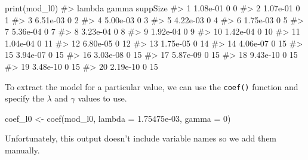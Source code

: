 \documentclass[
  letterpaper,
]{latex/krantz}
\makeatletter
\newenvironment{Shaded}{\begin{snugshade}}{\end{snugshade}}
\newcommand{\AttributeTok}[1]{\textcolor[rgb]{0.40,0.45,0.13}{#1}}
\newcommand{\CommentTok}[1]{\textcolor[rgb]{0.37,0.37,0.37}{#1}}
\newcommand{\DecValTok}[1]{\textcolor[rgb]{0.68,0.00,0.00}{#1}}
\newcommand{\FloatTok}[1]{\textcolor[rgb]{0.68,0.00,0.00}{#1}}
\newcommand{\FunctionTok}[1]{\textcolor[rgb]{0.28,0.35,0.67}{#1}}
\newcommand{\NormalTok}[1]{\textcolor[rgb]{0.00,0.23,0.31}{#1}}
\newcommand{\OtherTok}[1]{\textcolor[rgb]{0.00,0.23,0.31}{#1}}
\newenvironment{kframe}{%
\medskip{}
\setlength{\fboxsep}{.8em}
 \def\at@end@of@kframe{}%
 \ifinner\ifhmode%
  \def\at@end@of@kframe{\end{minipage}}%
  \begin{minipage}{\columnwidth}%
 \fi\fi%
 \def\FrameCommand##1{\hskip\@totalleftmargin \hskip-\fboxsep
 \colorbox{shadecolor}{##1}\hskip-\fboxsep
     \hskip-\linewidth \hskip-\@totalleftmargin \hskip\columnwidth}%
 \MakeFramed {\advance\hsize-\width
   \@totalleftmargin\z@ \linewidth\hsize
   \@setminipage}}%
 {\par\unskip\endMakeFramed%
 \at@end@of@kframe}
\renewenvironment{Shaded}{\begin{kframe}}{\end{kframe}}
\makeatother
\begin{document}
\begin{Shaded}
\begin{Highlighting}[]
\FunctionTok{print}\NormalTok{(mod\_l0)}
\CommentTok{\#\textgreater{}      lambda gamma suppSize}
\CommentTok{\#\textgreater{} 1  1.08e{-}01     0        0}
\CommentTok{\#\textgreater{} 2  1.07e{-}01     0        1}
\CommentTok{\#\textgreater{} 3  6.51e{-}03     0        2}
\CommentTok{\#\textgreater{} 4  5.00e{-}03     0        3}
\CommentTok{\#\textgreater{} 5  4.22e{-}03     0        4}
\CommentTok{\#\textgreater{} 6  1.75e{-}03     0        5}
\CommentTok{\#\textgreater{} 7  5.36e{-}04     0        7}
\CommentTok{\#\textgreater{} 8  3.23e{-}04     0        8}
\CommentTok{\#\textgreater{} 9  1.92e{-}04     0        9}
\CommentTok{\#\textgreater{} 10 1.42e{-}04     0       10}
\CommentTok{\#\textgreater{} 11 1.04e{-}04     0       11}
\CommentTok{\#\textgreater{} 12 6.80e{-}05     0       12}
\CommentTok{\#\textgreater{} 13 1.75e{-}05     0       14}
\CommentTok{\#\textgreater{} 14 4.06e{-}07     0       15}
\CommentTok{\#\textgreater{} 15 3.94e{-}07     0       15}
\CommentTok{\#\textgreater{} 16 3.03e{-}08     0       15}
\CommentTok{\#\textgreater{} 17 5.87e{-}09     0       15}
\CommentTok{\#\textgreater{} 18 9.43e{-}10     0       15}
\CommentTok{\#\textgreater{} 19 3.48e{-}10     0       15}
\CommentTok{\#\textgreater{} 20 2.19e{-}10     0       15}
\end{Highlighting}
\end{Shaded}

To extract the model for a particular value, we can use the
\texttt{coef()} function and
specify the \(\lambda\) and \(\gamma\) values to use.

\begin{Shaded}
\begin{Highlighting}[]
\NormalTok{coef\_l0 }\OtherTok{\textless{}{-}} \FunctionTok{coef}\NormalTok{(mod\_l0, }\AttributeTok{lambda =} \FloatTok{1.75475e{-}03}\NormalTok{, }\AttributeTok{gamma =} \DecValTok{0}\NormalTok{)}
\end{Highlighting}
\end{Shaded}

Unfortunately, this output doesn't include variable names so we add them
manually.
\end{document}
